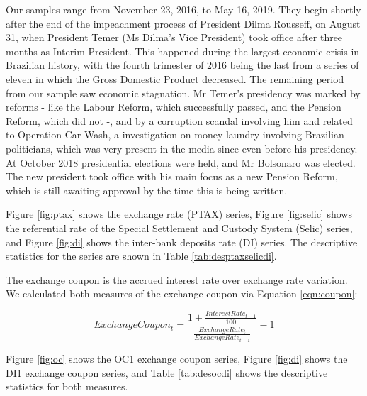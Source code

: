 \documentclass[cic,tc, english]{iiufrgs}
\begin{document}
    Our samples range from November 23, 2016, to May 16, 2019. They begin shortly after the end of the impeachment process of President Dilma Rousseff, on August 31, when President Temer (Ms Dilma's Vice President) took office after three months as Interim President. This happened during the largest economic crisis in Brazilian history, with the fourth trimester of 2016 being the last from a series of eleven in which the Gross Domestic Product decreased. The remaining period from our sample saw economic stagnation. Mr Temer's presidency was marked by reforms - like the Labour Reform, which successfully passed, and the Pension Reform, which did not -, and by a corruption scandal involving him and related to Operation Car Wash, a investigation on money laundry involving Brazilian politicians, which was very present in the media since even before his presidency. At October 2018 presidential elections were held, and Mr Bolsonaro was elected. The new president took office with his main focus as a new Pension Reform, which is still awaiting approval by the time this is being written.
    

    Figure \ref{fig:ptax} shows the exchange rate (PTAX) series, Figure \ref{fig:selic} shows the referential rate of the Special Settlement and Custody System (Selic) series, and Figure \ref{fig:di} shows the inter-bank deposits rate (DI) series. The descriptive statistics for the series are shown in Table \ref{tab:desptaxselicdi}.

    

    

    

    

    The exchange coupon is the accrued interest rate over exchange rate variation. We calculated both measures of the exchange coupon via Equation \ref{eqn:coupon}:

    \begin{equation}
        \label{eqn:coupon}
        ExchangeCoupon_t = \frac{1 + \frac{InterestRate_{t-1}}{100}}{\frac{ExchangeRate_t}{ExchangeRate_{t-1}}} - 1
    \end{equation}

    Figure \ref{fig:oc} shows the OC1 exchange coupon series, Figure \ref{fig:di} shows the DI1 exchange coupon series, and Table \ref{tab:desocdi} shows the descriptive statistics for both measures.

    
\end{document}
